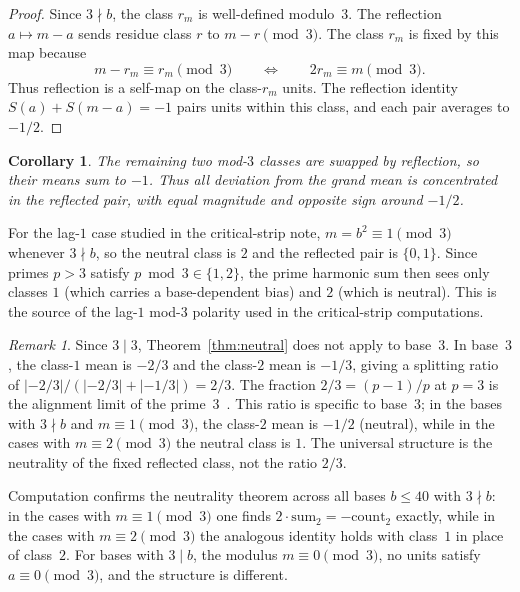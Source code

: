 \documentclass[12pt]{amsart}
\newtheorem{corollary}[theorem]{Corollary}
\theoremstyle{definition}
\theoremstyle{remark}
\newtheorem{remark}[theorem]{Remark}
\begin{document}
\begin{proof}
Since $3 \nmid b$, the class $r_m$ is well-defined modulo~$3$.
The reflection $a \mapsto m-a$ sends residue class $r$ to
$m-r \pmod{3}$. The class $r_m$ is fixed by this map because
\[
m-r_m \equiv r_m \pmod{3}
\qquad\Longleftrightarrow\qquad
2r_m \equiv m \pmod{3}.
\]
Thus reflection is a self-map on the class-$r_m$ units. The
reflection identity
$S(a) + S(m{-}a) = -1$ pairs units within this class,
and each pair averages to $-1/2$.
\end{proof}

\begin{corollary}\label{cor:swap}
The remaining two mod-$3$ classes are swapped by reflection,
so their means sum to $-1$. Thus all deviation from the
grand mean is concentrated in the reflected pair, with equal
magnitude and opposite sign around $-1/2$.
\end{corollary}

For the lag-$1$ case studied in the critical-strip note,
$m=b^2 \equiv 1 \pmod{3}$ whenever $3 \nmid b$, so the
neutral class is $2$ and the reflected pair is $\{0,1\}$.
Since primes $p>3$ satisfy $p \bmod 3 \in \{1,2\}$, the
prime harmonic sum then sees only classes $1$ (which carries
a base-dependent bias) and $2$ (which is neutral). This is
the source of the lag-$1$ mod-$3$ polarity used in the
critical-strip computations.

\begin{remark}
Since $3 \mid 3$, Theorem~\ref{thm:neutral} does not
apply to base~$3$.  In base~$3$, the class-$1$ mean
is $-2/3$ and the class-$2$ mean is $-1/3$, giving a
splitting ratio of
$|{-}2/3|/(|{-}2/3|{+}|{-}1/3|) = 2/3$. The fraction
$2/3 = (p{-}1)/p$ at $p = 3$ is the alignment limit
of the prime~$3$~\cite{paper1}. This ratio is specific
to base~$3$; in the bases with $3 \nmid b$ and
$m \equiv 1 \pmod{3}$, the class-$2$ mean is $-1/2$
(neutral), while in the cases with $m \equiv 2 \pmod{3}$
the neutral class is $1$. The universal structure is the
neutrality of the fixed reflected class, not the ratio $2/3$.
\end{remark}

Computation confirms the neutrality theorem across all
bases $b \le 40$ with $3 \nmid b$: in the cases with
$m \equiv 1 \pmod{3}$ one finds
$2 \cdot \text{sum}_2 = -\text{count}_2$ exactly, while
in the cases with $m \equiv 2 \pmod{3}$ the analogous
identity holds with class~$1$ in place of class~$2$.
For bases with $3 \mid b$, the modulus $m \equiv 0 \pmod{3}$,
no units satisfy $a \equiv 0 \pmod{3}$, and the
structure is different.
\end{document}
